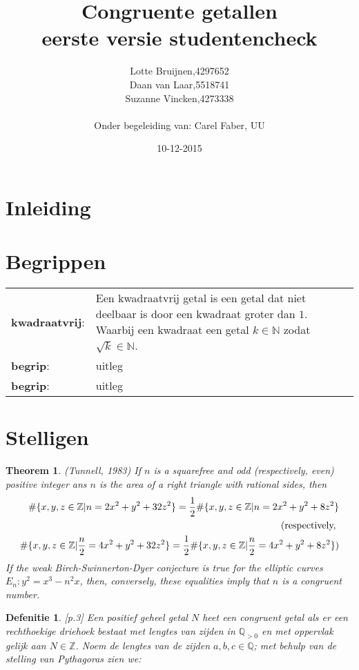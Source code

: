 \documentclass[12pt,reqno]{article}
\title{\textbf{Congruente getallen}\\
		\small{eerste versie studentencheck}}
\author{
	\begin{tabular}{ l l }
		Lotte Bruijnen, & 4297652 \\
		Daan van Laar, & 5518741 \\
		Suzanne Vincken, & 4273338
	\end{tabular}\\
	Onder begeleiding van: Carel Faber, UU
}
\date{10-12-2015}
\newcommand*{\NN}{\ensuremath{\mathbb{N}}}
\newcommand*{\ZZ}{\ensuremath{\mathbb{Z}}}
\newcommand*{\QQ}{\ensuremath{\mathbb{Q}}}
\begin{document}
	
	\maketitle
	\allowdisplaybreaks
	
	\section{Inleiding}
	
	
	\section{Begrippen}
	\begin{tabular}{ l p{10cm} }
		\textbf{kwadraatvrij}: \cite{Beukers} & Een kwadraatvrij getal is een getal dat niet deelbaar is door een kwadraat groter dan $1$. Waarbij een kwadraat een getal $k\in\NN$ zodat $\sqrt{k}\in\NN$.\\
		\textbf{begrip}: & uitleg \\
		\textbf{begrip}: & uitleg
	\end{tabular}
	
	\section{Stelligen}
	
	\newtheorem{Tunnell}{Theorem}
	\begin{Tunnell}
		\cite{Koblitz} (Tunnell, 1983) If $n$ is a squarefree and odd (respectively, even) positive integer ans $n$ is the area of a right triangle with rational sides, then
		\begin{align}
		\#\{x,y,z\in\ZZ|n=2x^2+y^2+32z^2\} = \frac{1}{2}\#\{x,y,z\in\ZZ|n=2x^2+y^2+8z^2\}\\
		\notag \text{(respectively, } \\
		\#\{x,y,z\in\ZZ|\frac{n}{2}=4x^2+y^2+32z^2\} = \frac{1}{2}\#\{x,y,z\in\ZZ|\frac{n}{2}=4x^2+y^2+8z^2\})
		\end{align}
		If the weak Birch-Swinnerton-Dyer conjecture is true for the elliptic curves $E_n:y^2=x^3-n^2x$, then, conversely, these equalities imply that $n$ is a congruent number.
	\end{Tunnell}
	
	\newtheorem{CG}{Defenitie}
	\begin{CG}
		\cite{Oort}[p.3] Een positief geheel getal $N$ heet een congruent getal als er een rechthoekige driehoek bestaat met lengtes van zijden in $\QQ_{>0}$ en met oppervlak gelijk aan $N\in\ZZ$. Noem de lengtes van de zijden $a,b,c\in\QQ$; met behulp van de stelling van Pythagoras zien we:
		
	\end{CG}
	
\end{document}

